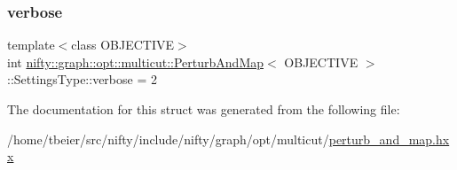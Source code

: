 \subsubsection{\texorpdfstring{verbose}{verbose}}
{\footnotesize\ttfamily template$<$class O\+B\+J\+E\+C\+T\+I\+VE$>$ \\
int \hyperlink{classnifty_1_1graph_1_1opt_1_1multicut_1_1PerturbAndMap}{nifty\+::graph\+::opt\+::multicut\+::\+Perturb\+And\+Map}$<$ O\+B\+J\+E\+C\+T\+I\+VE $>$\+::Settings\+Type\+::verbose = 2}



The documentation for this struct was generated from the following file\+:\begin{DoxyCompactItemize}
\item 
/home/tbeier/src/nifty/include/nifty/graph/opt/multicut/\hyperlink{perturb__and__map_8hxx}{perturb\+\_\+and\+\_\+map.\+hxx}\end{DoxyCompactItemize}
